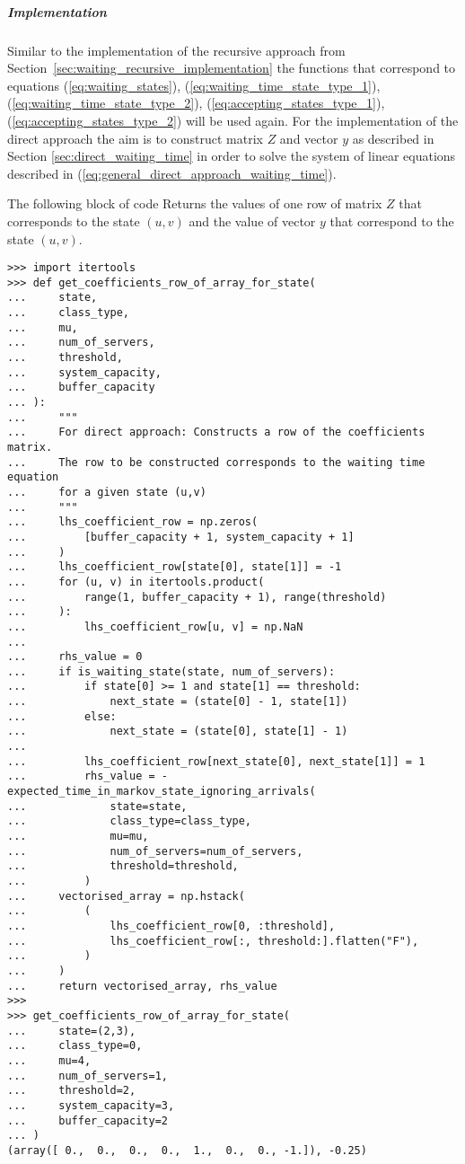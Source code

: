 \subparagraph{Implementation}\label{sec:waiting_direct_implementation}

Similar to the implementation of the recursive approach from
Section~\ref{sec:waiting_recursive_implementation} the functions that correspond
to equations (\ref{eq:waiting_states}), (\ref{eq:waiting_time_state_type_1}),
(\ref{eq:waiting_time_state_type_2}), (\ref{eq:accepting_states_type_1}),
(\ref{eq:accepting_states_type_2}) will be used again.
For the implementation of the direct approach the aim is to construct matrix
\(Z\) and vector \(y\) as described in Section
\ref{sec:direct_waiting_time} in order to solve the system of linear
equations described in (\ref{eq:general_direct_approach_waiting_time}).

The following block of code Returns the values of one row of matrix \(Z\) that
corresponds to the state \((u,v)\) and the value of vector \(y\) that
correspond to the state \((u,v)\).

\begin{lstlisting}[style=pystyle]
>>> import itertools
>>> def get_coefficients_row_of_array_for_state(
...     state,
...     class_type,
...     mu,
...     num_of_servers,
...     threshold,
...     system_capacity,
...     buffer_capacity
... ):
...     """
...     For direct approach: Constructs a row of the coefficients matrix.
...     The row to be constructed corresponds to the waiting time equation
...     for a given state (u,v)
...     """
...     lhs_coefficient_row = np.zeros(
...         [buffer_capacity + 1, system_capacity + 1]
...     )
...     lhs_coefficient_row[state[0], state[1]] = -1
...     for (u, v) in itertools.product(
...         range(1, buffer_capacity + 1), range(threshold)
...     ):
...         lhs_coefficient_row[u, v] = np.NaN
... 
...     rhs_value = 0
...     if is_waiting_state(state, num_of_servers):
...         if state[0] >= 1 and state[1] == threshold:
...             next_state = (state[0] - 1, state[1])
...         else:
...             next_state = (state[0], state[1] - 1)
... 
...         lhs_coefficient_row[next_state[0], next_state[1]] = 1
...         rhs_value = -expected_time_in_markov_state_ignoring_arrivals(
...             state=state,
...             class_type=class_type,
...             mu=mu,
...             num_of_servers=num_of_servers,
...             threshold=threshold,
...         )
...     vectorised_array = np.hstack(
...         (
...             lhs_coefficient_row[0, :threshold],
...             lhs_coefficient_row[:, threshold:].flatten("F"),
...         )
...     )
...     return vectorised_array, rhs_value
>>>
>>> get_coefficients_row_of_array_for_state(
...     state=(2,3),
...     class_type=0,
...     mu=4,
...     num_of_servers=1,
...     threshold=2,
...     system_capacity=3,
...     buffer_capacity=2
... )
(array([ 0.,  0.,  0.,  0.,  1.,  0.,  0., -1.]), -0.25)

\end{lstlisting}

